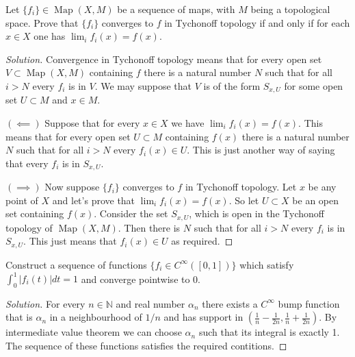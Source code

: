 \documentclass{article}
\newcommand{\N}{\mathbb{N}}
\DeclareMathOperator{\Map}{Map}
\begin{document}
\begin{exercise}
	Let $\{f_i\} \in \Map(X,M)$ be a sequence of maps, with $M$ being a topological space. Prove that $\{f_i\}$ converges to $f$ in Tychonoff topology if and only if for each $x \in X$ one has $\lim_i f_i(x) = f(x)$.
\end{exercise}
\begin{proof}[Solution]
	Convergence in Tychonoff topology means that for every open set $V\subset\Map(X,M)$ containing $f$ there is a natural number $N$ such that for all $i>N$ every $f_i$ is in $V$. We may suppose that $V$ is of the form $S_{x,U}$ for some open set $U\subset M$ and $x\in M$.
	
	$(\impliedby)$ Suppose that for every $x\in X$ we have $\lim_if_i(x)=f(x)$. This means that for every open set $U\subset M$ containing $f(x)$ there is a natural number $N$ such that for all $i>N$ every $f_i(x)\in U$. This is just another way of saying that every $f_i$ is in $S_{x,U}$.
	
	 $(\implies)$ Now suppose $\{f_i\}$ converges to $f$ in Tychonoff topology. Let $x$ be any point of $X$ and let's prove that $\lim_if_i(x)=f(x)$. So let $U\subset X$ be an open set containing $f(x)$. Consider the set $S_{x,U}$, which is open in the Tychonoff topology of $\Map(X,M)$. Then there is $N$ such that for all $i>N$ every $f_i$ is in $S_{x,U}$. This just means that $f_i(x)\in U$ as required.
\end{proof}

\begin{exercise}
	Construct a sequence of functions $\{f_i \in C^\infty ([0, 1])\}$ which satisfy $\int_0^1|f_i(t)|dt = 1$ and converge pointwise to 0.
\end{exercise}
\begin{proof}[Solution]
	For every $n\in\N$ and real number $\alpha_n$ there exists a $C^\infty$ bump function that is $\alpha_n$ in a neighbourhood of $1/n$ and has support in $\left(\frac{1}{n}-\frac{1}{2n},\frac{1}{n}+\frac{1}{2n}\right)$. By intermediate value theorem we can choose $\alpha_n$ such that its integral is exactly 1. The sequence of these functions satisfies the required contitions.
\end{proof}

\end{document}
